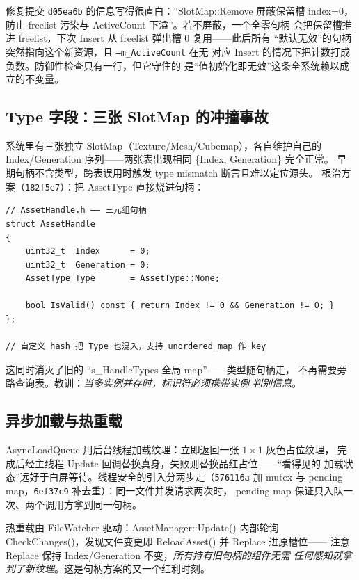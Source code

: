 修复提交 \texttt{d05ea6b} 的信息写得很直白：``SlotMap::Remove 屏蔽保留槽
index=0，防止 freelist 污染与 ActiveCount 下溢''。若不屏蔽，一个全零句柄
会把保留槽推进 freelist，下次 Insert 从 freelist 弹出槽 0 复用——此后所有
``默认无效''的句柄突然指向这个新资源，且 \texttt{--m\_ActiveCount} 在无
对应 Insert 的情况下把计数打成负数。防御性检查只有一行，但它守住的
是``值初始化即无效''这条全系统赖以成立的不变量。

\subsection{Type 字段：三张 SlotMap 的冲撞事故}

系统里有三张独立 SlotMap（Texture/Mesh/Cubemap），各自维护自己的
Index/Generation 序列——两张表出现相同 \{Index, Generation\} 完全正常。
早期句柄不含类型，跨表误用时触发 type mismatch 断言且难以定位源头。
根治方案（\texttt{182f5e7}）：把 AssetType 直接烧进句柄：

\begin{lstlisting}
// AssetHandle.h —— 三元组句柄
struct AssetHandle
{
    uint32_t  Index      = 0;
    uint32_t  Generation = 0;
    AssetType Type       = AssetType::None;

    bool IsValid() const { return Index != 0 && Generation != 0; }
};

// 自定义 hash 把 Type 也混入，支持 unordered_map 作 key
\end{lstlisting}

这同时消灭了旧的 ``s\_HandleTypes 全局 map''——类型随句柄走，
不再需要旁路查询表。教训：\emph{当多实例并存时，标识符必须携带实例
判别信息}。

\subsection{异步加载与热重载}

AsyncLoadQueue 用后台线程加载纹理：立即返回一张 $1\times1$ 灰色占位纹理，
完成后经主线程 Update 回调替换真身，失败则替换品红占位——``看得见的
加载状态''远好于白屏等待。线程安全的引入分两步走（\texttt{576116a} 加
mutex 与 pending map，\texttt{6ef37c9} 补去重）：同一文件并发请求两次时，
pending map 保证只入队一次、两个调用方拿到同一句柄。

热重载由 FileWatcher 驱动：AssetManager::Update() 内部轮询
CheckChanges()，发现文件变更即 ReloadAsset() 并 Replace 进原槽位——
注意 Replace 保持 Index/Generation 不变，\emph{所有持有旧句柄的组件无需
任何感知就拿到了新纹理}。这是句柄方案的又一个红利时刻。


